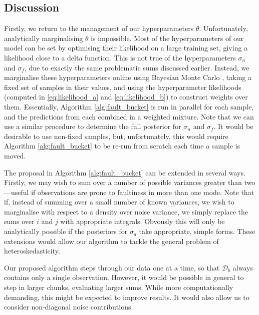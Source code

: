 \documentclass{article}
\newcommand{\cm}[1]{\ensuremath{\mathcal{#1}}}
\newcommand{\data}{\ensuremath{\cm{D}}}
\begin{document}
\subsection{Discussion}

Firstly, we return to the management of our hyperparameters $\theta$. Unfortunately, analytically marginalising $\theta$ is impossible. Most of the hyperparameters of our model can be set by optimising their likelihood on a large training set, giving a likelihood close to a delta function. This is not true of the hyperparameters $\sigma_n$ and $\sigma_f$, due to exactly the same problematic sums discussed earlier. Instead, we marginalise these hyperparameters online using Bayesian Monte Carlo \citep[Chapter 7]{osbornebayesian}, taking a fixed set of samples in their values, and using the hyperparameter likelihoods (computed in \eqref{eq:likelihood_a} and \eqref{eq:likelihood_b}) to construct weights over them. Essentially, Algorithm \ref{alg:fault_bucket} is run in parallel for each sample, and the predictions from each combined in a weighted mixture. Note that we can use a similar procedure \cite{garnettosborne} to determine the full posterior for $\sigma_n$ and $\sigma_f$.
It would be desirable to use non-fixed samples, but, unfortunately, this would require Algorithm \ref{alg:fault_bucket} to be re-run from scratch each time a sample is moved. 

The proposal in Algorithm \ref{alg:fault_bucket} can be extended in several ways. Firstly, we may wish to sum over a number of possible variances greater than two---useful if observations are prone to faultiness in more than one mode. 
Note that if, instead of summing over a small number of known variances, we wish to marginalise with respect to a density over noise variance, we simply replace the sums over $i$ and $j$ with appropriate integrals. Obvously this will only be analytically possible if the posteriors for $\sigma_a$ take appropriate, simple forms. 
These extensions would allow our algorithm to tackle the general problem of heteroskedasticity.

Our proposed algorithm steps through our data one at a time, so that $\data_b$ always contains only a single observation. However, it would be possible in general to step in larger chunks, evaluating larger sums. While more computationally demanding, this might be expected to improve results. It would also allow us to consider non-diagonal noise contributions.
\end{document}
